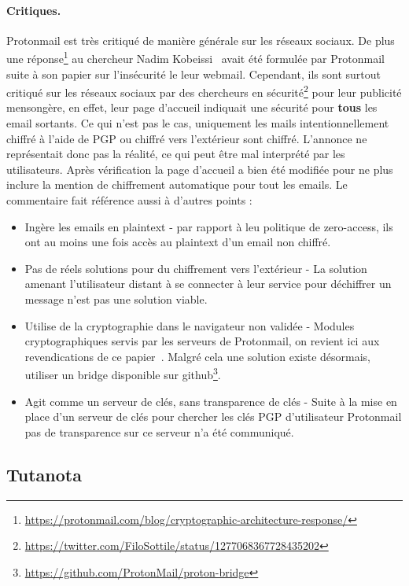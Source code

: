 \paragraph*{Critiques.}
Protonmail est très critiqué de manière générale sur les réseaux sociaux. De plus une réponse\footnote{\url{https://protonmail.com/blog/cryptographic-architecture-response/}} au chercheur Nadim Kobeissi~\cite{DBLP:journals/iacr/Kobeissi18a} avait été formulée par Protonmail suite à son papier sur l'insécurité le leur webmail. Cependant, ils sont surtout critiqué sur les réseaux sociaux par des chercheurs en sécurité\footnote{\url{https://twitter.com/FiloSottile/status/1277068367728435202}} pour leur publicité mensongère, en effet, leur page d'accueil indiquait une sécurité pour \textbf{tous} les email sortants. Ce qui n'est pas le cas, uniquement les mails intentionnellement chiffré à l'aide de PGP ou chiffré vers l'extérieur sont chiffré. L'annonce ne représentait donc pas la réalité, ce qui peut être mal interprété par les utilisateurs. Après vérification la page d'accueil a bien été modifiée pour ne plus inclure la mention de chiffrement automatique pour tout les emails. Le commentaire fait référence aussi à d'autres points :
\begin{itemize}
	\item Ingère les emails en plaintext - par rapport à leu politique de zero-access, ils ont au moins une fois accès au plaintext d'un email non chiffré.
	\item Pas de réels solutions pour du chiffrement vers l'extérieur - La solution amenant l'utilisateur distant à se connecter à leur service pour déchiffrer un message n'est pas une solution viable.
	\item Utilise de la cryptographie dans le navigateur non validée - Modules cryptographiques servis par les serveurs de Protonmail, on revient ici aux revendications de ce papier~\cite{DBLP:journals/iacr/Kobeissi18a}. Malgré cela une solution existe désormais, utiliser un bridge disponible sur github\footnote{\url{https://github.com/ProtonMail/proton-bridge}}.
	\item Agit comme un serveur de clés, sans transparence de clés - Suite à la mise en place d'un serveur de clés pour chercher les clés PGP d'utilisateur Protonmail pas de transparence sur ce serveur n'a été communiqué.
\end{itemize}
\subsection{Tutanota}
